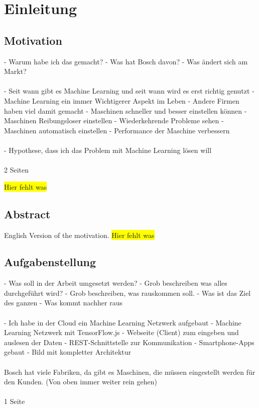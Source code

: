 \chapter{Einleitung}
\label{ch:einleitung}

\section{Motivation}
\label{sec:motivation}
- Warum habe ich das gemacht?
- Was hat Bosch davon?
- Was ändert sich am Markt?
\\ \\
- Seit wann gibt es Machine Learning und seit wann wird es erst richtig genutzt
- Machine Learning ein immer Wichtigerer Aspekt im Leben
- Andere Firmen haben viel damit gemacht
- Maschinen schneller und besser einstellen können
- Maschinen Reibungsloser einstellen
- Wiederkehrende Probleme sehen
- Maschinen automatisch einstellen
- Performance der Maschine verbessern
\\ \\
- Hypothese, dass ich das Problem mit Machine Learning lösen will
\\ \\
2 Seiten

\colorbox{yellow}{Hier fehlt was}

\section{Abstract}
English Version of the motivation.
\colorbox{yellow}{Hier fehlt was}

\section{Aufgabenstellung}
\label{sec:aufgabenstellung}
- Was soll in der Arbeit umgesetzt werden?
- Grob beschreiben was alles durchgeführt wird?
- Grob beschreiben, was rauskommen soll.
- Was ist das Ziel des ganzen
- Was kommt nachher raus
\\ \\
- Ich habe in der Cloud ein Machine Learning Netzwerk aufgebaut
- Machine Learning Netzwerk mit TensorFlow.js
- Webseite (Client) zum eingeben und auslesen der Daten
- REST-Schnittstelle zur Kommunikation
- Smartphone-Apps gebaut
- Bild mit kompletter Architektur
\\ \\
Bosch hat viele Fabriken, da gibt es Maschinen, die müssen eingestellt werden für den Kunden. (Von oben immer weiter
rein gehen)
\\ \\
1 Seite

